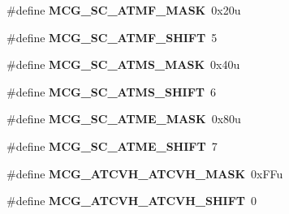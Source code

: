 \begin{DoxyCompactItemize}
\item 
\hypertarget{group___m_c_g___register___masks_ga15326687d7d214b4847a3cae6e6cdfaa}{}\#define {\bfseries M\+C\+G\+\_\+\+S\+C\+\_\+\+A\+T\+M\+F\+\_\+\+M\+A\+S\+K}~0x20u\label{group___m_c_g___register___masks_ga15326687d7d214b4847a3cae6e6cdfaa}

\item 
\hypertarget{group___m_c_g___register___masks_gac7fd1ff91fc1de6800a18f875398d966}{}\#define {\bfseries M\+C\+G\+\_\+\+S\+C\+\_\+\+A\+T\+M\+F\+\_\+\+S\+H\+I\+F\+T}~5\label{group___m_c_g___register___masks_gac7fd1ff91fc1de6800a18f875398d966}

\item 
\hypertarget{group___m_c_g___register___masks_gaf5a12b51cc62a0ce10f3fbecdebd0222}{}\#define {\bfseries M\+C\+G\+\_\+\+S\+C\+\_\+\+A\+T\+M\+S\+\_\+\+M\+A\+S\+K}~0x40u\label{group___m_c_g___register___masks_gaf5a12b51cc62a0ce10f3fbecdebd0222}

\item 
\hypertarget{group___m_c_g___register___masks_ga9a8ce406d5868276e9c3b37190ab89b1}{}\#define {\bfseries M\+C\+G\+\_\+\+S\+C\+\_\+\+A\+T\+M\+S\+\_\+\+S\+H\+I\+F\+T}~6\label{group___m_c_g___register___masks_ga9a8ce406d5868276e9c3b37190ab89b1}

\item 
\hypertarget{group___m_c_g___register___masks_gaf9545e815c86bd04d8513af024cb8617}{}\#define {\bfseries M\+C\+G\+\_\+\+S\+C\+\_\+\+A\+T\+M\+E\+\_\+\+M\+A\+S\+K}~0x80u\label{group___m_c_g___register___masks_gaf9545e815c86bd04d8513af024cb8617}

\item 
\hypertarget{group___m_c_g___register___masks_ga146594251d4266d02fecc44c1f0dd6ae}{}\#define {\bfseries M\+C\+G\+\_\+\+S\+C\+\_\+\+A\+T\+M\+E\+\_\+\+S\+H\+I\+F\+T}~7\label{group___m_c_g___register___masks_ga146594251d4266d02fecc44c1f0dd6ae}

\item 
\hypertarget{group___m_c_g___register___masks_gaf989f84acb1a8c91c7c98c2255651b00}{}\#define {\bfseries M\+C\+G\+\_\+\+A\+T\+C\+V\+H\+\_\+\+A\+T\+C\+V\+H\+\_\+\+M\+A\+S\+K}~0x\+F\+Fu\label{group___m_c_g___register___masks_gaf989f84acb1a8c91c7c98c2255651b00}

\item 
\hypertarget{group___m_c_g___register___masks_ga0fec2d450a98ab78dc7a2e4e9e33dbc6}{}\#define {\bfseries M\+C\+G\+\_\+\+A\+T\+C\+V\+H\+\_\+\+A\+T\+C\+V\+H\+\_\+\+S\+H\+I\+F\+T}~0\label{group___m_c_g___register___masks_ga0fec2d450a98ab78dc7a2e4e9e33dbc6}


\end{DoxyCompactItemize}

